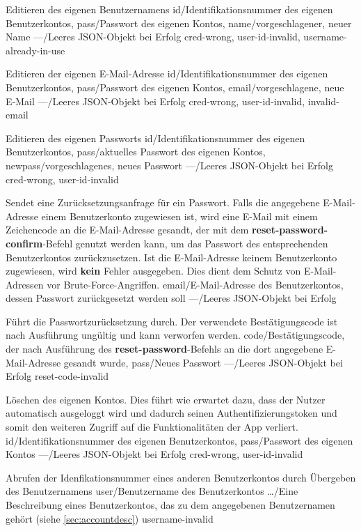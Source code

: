 \documentclass[parskip=full,11pt]{scrartcl}
\begin{document}
{Editieren des eigenen Benutzernamens}
{id/Identifikationsnummer des eigenen Benutzerkontos,
pass/Passwort des eigenen Kontos,
name/vorgeschlagener{,} neuer Name}
{---/Leeres JSON-Objekt bei Erfolg}
{cred-wrong, user-id-invalid, username-already-in-use}

{Editieren der eigenen E-Mail-Adresse}
{id/Identifikationsnummer des eigenen Benutzerkontos,
pass/Passwort des eigenen Kontos,
email/vorgeschlagene{,} neue E-Mail}
{---/Leeres JSON-Objekt bei Erfolg}
{cred-wrong, user-id-invalid, invalid-email}\

{Editieren des eigenen Passworts}
{id/Identifikationsnummer des eigenen Benutzerkontos,
pass/aktuelles Passwort des eigenen Kontos,
newpass/vorgeschlagenes{,} neues Passwort}
{---/Leeres JSON-Objekt bei Erfolg}
{cred-wrong, user-id-invalid}

{Sendet eine Zurücksetzungsanfrage für ein Passwort.
Falls die angegebene E-Mail-Adresse einem Benutzerkonto zugewiesen ist, wird
eine E-Mail mit einem Zeichencode an die E-Mail-Adresse gesandt, der mit dem
\textbf{reset-password-confirm}-Befehl genutzt werden kann, um das Passwort des
entsprechenden Benutzerkontos zurückzusetzen.
Ist die E-Mail-Adresse keinem Benutzerkonto zugewiesen, wird \textbf{kein}
Fehler ausgegeben.
Dies dient dem Schutz von E-Mail-Adressen vor Brute-Force-Angriffen.}
{email/E-Mail-Adresse des Benutzerkontos{,} dessen Passwort zurückgesetzt werden
soll}
{---/Leeres JSON-Objekt bei Erfolg}
{}

{Führt die Passwortzurücksetzung durch.
Der verwendete Bestätigungscode ist nach Ausführung ungültig und kann
verworfen werden.}
{code/Bestätigungscode{,} der nach Ausführung des \textbf{reset-password}-Befehls
an die dort angegebene E-Mail-Adresse gesandt wurde,
pass/Neues Passwort}
{---/Leeres JSON-Objekt bei Erfolg}
{reset-code-invalid}

{Löschen des eigenen Kontos. Dies führt wie erwartet dazu{,}
dass der Nutzer automatisch ausgeloggt wird und dadurch seinen
Authentifizierungstoken und somit den weiteren Zugriff auf die Funktionalitäten
der App verliert.}
{id/Identifikationsnummer des eigenen Benutzerkontos,
pass/Passwort des eigenen Kontos}
{---/Leeres JSON-Objekt bei Erfolg}
{cred-wrong, user-id-invalid}

{Abrufen der Idenfikationsnummer eines anderen Benutzerkontos durch Übergeben
des Benutzernamens}
{user/Benutzername des Benutzerkontos}
{\dots/Eine Beschreibung eines Benutzerkontos{,} das zu dem angegebenen
Benutzernamen gehört (siehe \ref{sec:accountdesc})}
{username-invalid}
\end{document}
